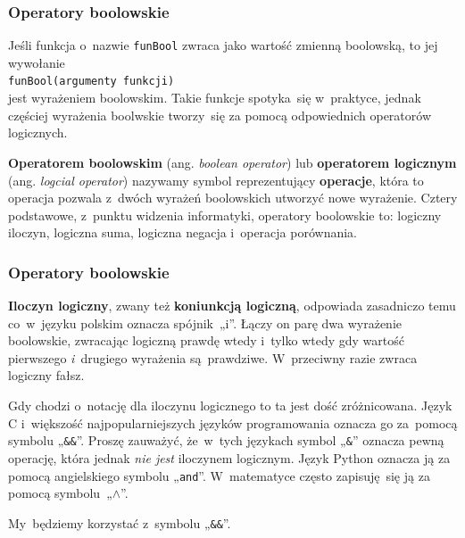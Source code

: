 \documentclass[10pt,t]{beamer}
\begin{document}
\begin{frame}
  \frametitle{Operatory boolowskie}


  Jeśli funkcja o~nazwie \texttt{funBool} zwraca jako wartość zmienną
  boolowską, to jej wywołanie \\
  \texttt{funBool(argumenty funkcji)} \\
  jest wyrażeniem boolowskim. Takie funkcje spotyka~się w~praktyce, jednak
  częściej wyrażenia boolwskie tworzy~się za pomocą odpowiednich operatorów
  logicznych.

  \textbf{Operatorem boolowskim} (ang. \textit{boolean operator}) lub
  \textbf{operatorem logicznym} (ang. \textit{logcial operator})
  nazywamy symbol reprezentujący \textbf{operacje}, która to operacja
  pozwala z~dwóch wyrażeń boolowskich utworzyć nowe wyrażenie. Cztery
  podstawowe, z~punktu widzenia informatyki, operatory boolowskie to:
  logiczny iloczyn, logiczna suma, logiczna negacja i~operacja porównania.

\end{frame}





\begin{frame}
  \frametitle{Operatory boolowskie}


  \textbf{Iloczyn logiczny}, zwany też \textbf{koniunkcją logiczną},
  odpowiada zasadniczo temu co~w~języku polskim oznacza spójnik~„i”. Łączy
  on parę dwa wyrażenie boolowskie, zwracając logiczną prawdę wtedy i~tylko
  wtedy gdy wartość pierwszego \textit{i}~drugiego wyrażenia są~prawdziwe.
  W~przeciwny razie zwraca logiczny fałsz.

  Gdy chodzi o~notację dla iloczynu logicznego to ta jest dość zróżnicowana.
  Język C i~większość najpopularniejszych języków programowania oznacza
  go za~pomocą symbolu „\texttt{\&\&}”. Proszę zauważyć, że~w~tych językach
  symbol „\texttt{\&}” oznacza pewną operację, która jednak \textit{nie
    jest} iloczynem logicznym. Język Python oznacza ją za pomocą
  angielskiego symbolu „\texttt{and}”. W~matematyce często zapisuję~się ją
  za pomocą symbolu~„$\wedge$”.

  My~będziemy korzystać z~symbolu „\texttt{\&\&}”.

\end{frame}
\end{document}
